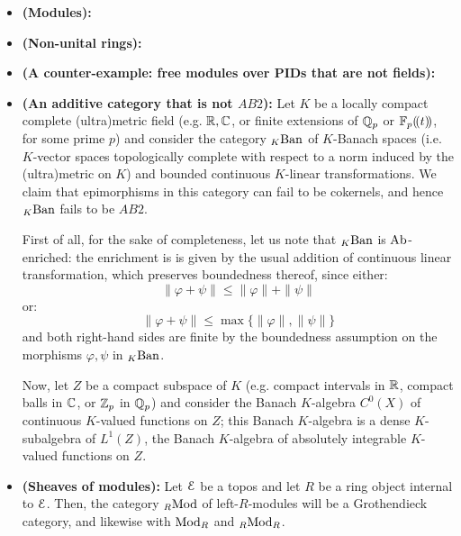                     \begin{example} \label{examples: AB_categories}
                        \noindent
                        \begin{itemize}
                            \item \textbf{(Modules):}
                            \item \textbf{(Non-unital rings):}
                            \item \textbf{(A counter-example: free modules over PIDs that are not fields):}
                            \item \textbf{(An additive category that is not $AB2$):} Let $K$ be a locally compact complete (ultra)metric field (e.g. $\mathbb{R}, \mathbb{C}$, or finite extensions of $\mathbb{Q}_p$ or $\mathbb{F}_p(\!(t)\!)$, for some prime $p$) and consider the category ${}_K\mathrm{Ban}$ of $K$-Banach spaces (i.e. $K$-vector spaces topologically complete with respect to a norm induced by the (ultra)metric on $K$) and bounded continuous $K$-linear transformations. We claim that epimorphisms in this category can fail to be cokernels, and hence ${}_K\mathrm{Ban}$ fails to be $AB2$.
                            
                            First of all, for the sake of completeness, let us note that ${}_K\mathrm{Ban}$ is $\mathrm{Ab}$-enriched: the enrichment is is given by the usual addition of continuous linear transformation, which preserves boundedness thereof, since either:
                                $$\|\varphi + \psi\| \leq \|\varphi\| + \|\psi\|$$
                            or:
                                $$\|\varphi + \psi\| \leq \max\{\|\varphi\|, \|\psi\|\}$$
                            and both right-hand sides are finite by the boundedness assumption on the morphisms $\varphi, \psi$ in ${}_K\mathrm{Ban}$.
                            
                            Now, let $Z$ be a compact subspace of $K$ (e.g. compact intervals in $\mathbb{R}$, compact balls in $\mathbb{C}$, or $\mathbb{Z}_p$ in $\mathbb{Q}_p$) and consider the Banach $K$-algebra $C^0(X)$ of continuous $K$-valued functions on $Z$; this Banach $K$-algebra is a dense $K$-subalgebra of $L^1(Z)$, the Banach $K$-algebra of absolutely integrable $K$-valued functions on $Z$.
                            \item \textbf{(Sheaves of modules):} Let $\mathcal{E}$ be a topos and let $R$ be a ring object internal to $\mathcal{E}$. Then, the category ${}_R\mathrm{Mod}$ of left-$R$-modules will be a Grothendieck category, and likewise with $\mathrm{Mod}_R$ and ${}_R\mathrm{Mod}_R$.
                        \end{itemize}
                    \end{example}
                    
